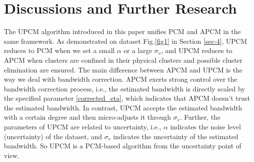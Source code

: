 \documentclass[journal]{IEEEtran}
\theoremstyle{definition}
\begin{document}
\section{Discussions and Further Research}
\label{sec-5}
The UPCM algorithm introduced in this paper unifies PCM and APCM in the same framework. As demonstrated on dataset Fig.\ref{fig1} in Section \ref{sec-4}, UPCM reduces to PCM when we set a small $\alpha$ or a large $\sigma_v$, and UPCM reduces to APCM when clusters are confined in their physical clusters and possible cluster elimination are ensured.
The main difference between APCM and UPCM is the way we deal with bandwidth correction.
APCM exerts strong control over the bandwidth correction process, i.e., the estimated bandwidth is directly scaled by the specified parameter \ref{corrected_eta}, which indicates that APCM doesn't trust the estimated bandwidth. In contrast, UPCM accepts the estimated bandwidth with a certain degree and then micro-adjusts it through $\sigma_v$. Further, the parameters of UPCM are related to uncertainty, i.e., $\alpha$ indicates the noise level (uncertainty) of the dataset, and $\sigma_v$ indicates the uncertainty of the estimated bandwidth. So UPCM is a PCM-based algorithm from the uncertainty point of view.
\end{document}
